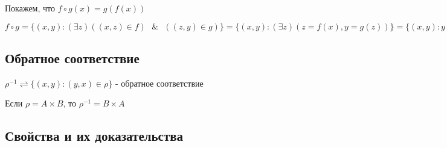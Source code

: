 \documentclass{report}
\newcommand{\band}{\mbox{ } \& \mbox{ }}
\begin{document}
\medskip

Покажем, что $f \circ g(x) = g(f(x))$

\medskip

$f \circ g = \{(x,y): (\exists z)((x,z) \in f) \band ((z,y) \in g)\} = \{(x,y):(\exists z)(z = f(x), y = g(z))\} = \{(x,y): y = g(f(x))\}$

\subsection{Обратное соответствие}
$\rho^{-1} \rightleftharpoons \{(x,y): (y,x) \in \rho\}$ - обратное соответствие


Если $\rho = A \times B$, то $\rho^{-1} = B \times A$

\subsection{Свойства и их доказательства}
\end{document}
